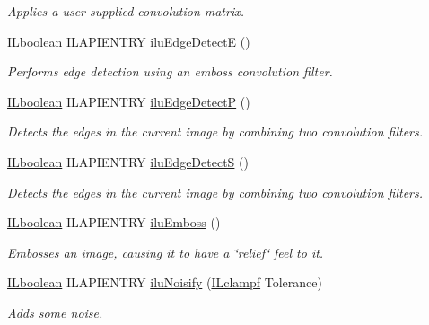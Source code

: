\begin{DoxyCompactItemize}
\begin{DoxyCompactList}\small\item\em Applies a user supplied convolution matrix. \end{DoxyCompactList}\item 
\hyperlink{group__il__types_gaa6aa7c95cfdc06b4d8601ef832b7bb0a}{I\+Lboolean} I\+L\+A\+P\+I\+E\+N\+T\+R\+Y \hyperlink{group__ilu__filter_gafbd320c463d5e8a45e68d0edb3973597}{ilu\+Edge\+Detect\+E} ()
\begin{DoxyCompactList}\small\item\em Performs edge detection using an emboss convolution filter. \end{DoxyCompactList}\item 
\hyperlink{group__il__types_gaa6aa7c95cfdc06b4d8601ef832b7bb0a}{I\+Lboolean} I\+L\+A\+P\+I\+E\+N\+T\+R\+Y \hyperlink{group__ilu__filter_gac902e008927e48ce132306e344f5010d}{ilu\+Edge\+Detect\+P} ()
\begin{DoxyCompactList}\small\item\em Detects the edges in the current image by combining two convolution filters. \end{DoxyCompactList}\item 
\hyperlink{group__il__types_gaa6aa7c95cfdc06b4d8601ef832b7bb0a}{I\+Lboolean} I\+L\+A\+P\+I\+E\+N\+T\+R\+Y \hyperlink{group__ilu__filter_ga91f176b607f5357b748079e21a6bbc63}{ilu\+Edge\+Detect\+S} ()
\begin{DoxyCompactList}\small\item\em Detects the edges in the current image by combining two convolution filters. \end{DoxyCompactList}\item 
\hyperlink{group__il__types_gaa6aa7c95cfdc06b4d8601ef832b7bb0a}{I\+Lboolean} I\+L\+A\+P\+I\+E\+N\+T\+R\+Y \hyperlink{group__ilu__filter_gab94eba669177860af590c7bed1927c30}{ilu\+Emboss} ()
\begin{DoxyCompactList}\small\item\em Embosses an image, causing it to have a \char`\"{}relief\char`\"{} feel to it. \end{DoxyCompactList}\item 
\hyperlink{group__il__types_gaa6aa7c95cfdc06b4d8601ef832b7bb0a}{I\+Lboolean} I\+L\+A\+P\+I\+E\+N\+T\+R\+Y \hyperlink{group__ilu__filter_gac4c1596626e01c41075c7fdeda113642}{ilu\+Noisify} (\hyperlink{group__il__types_gae90d8075bf3ef2cd89c09b26fd4dbef2}{I\+Lclampf} Tolerance)
\begin{DoxyCompactList}\small\item\em Adds some noise. \end{DoxyCompactList}\item 

\end{DoxyCompactItemize}
